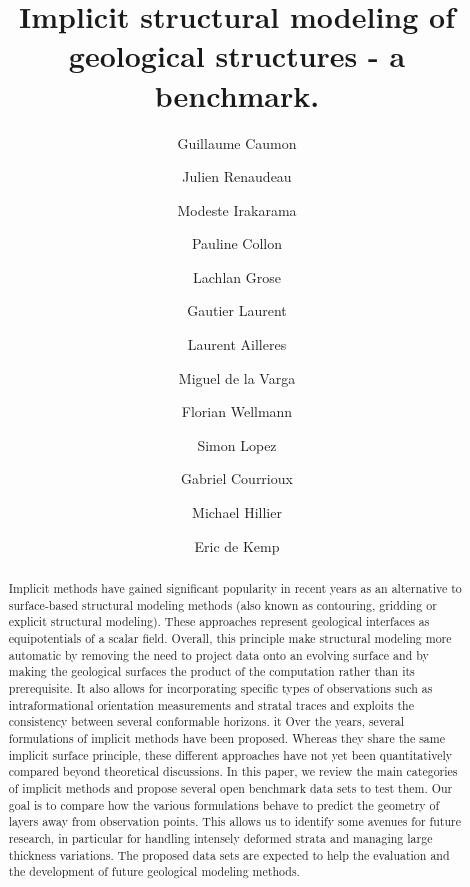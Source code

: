 \documentclass[preprint]{elsarticle}
\title{Implicit structural modeling of geological structures - a benchmark.}
\author[1]{Guillaume Caumon}
\author[1,2]{Julien Renaudeau}
\author[1]{Modeste Irakarama}
\author[1]{Pauline Collon}
\author[3]{Lachlan Grose}
\author[4]{Gautier Laurent}
\author[3]{Laurent Ailleres}
\author[5]{Miguel de la Varga}
\author[5]{Florian Wellmann}
\author[6]{Simon Lopez}
\author[6]{Gabriel Courrioux}
\author[7]{Michael Hillier}
\author[7]{Eric de Kemp}
\begin{document}
\maketitle

\begin{abstract}

Implicit methods have gained significant popularity in recent years as 
an alternative to surface-based structural modeling methods (also known as 
contouring, gridding or explicit structural modeling). These approaches represent 
geological interfaces as equipotentials of a scalar field. 
Overall, this principle make structural modeling more automatic 
by removing the need to project data onto an evolving surface and by making 
the geological surfaces the product of the computation rather than its 
prerequisite. It also allows for incorporating specific types of observations such as 
intraformational orientation measurements and stratal traces and exploits the 
consistency between several conformable horizons. it  Over the years, several 
formulations of implicit methods have been proposed. Whereas they share the 
same implicit surface principle, these different approaches have not yet been 
quantitatively compared beyond theoretical discussions. In this paper, we review 
the main categories of implicit methods and propose several open benchmark data 
sets to test them. Our goal is to compare how the various 
formulations behave to predict the geometry of layers away from observation 
points. This allows us to identify some avenues for future research, in 
particular for handling intensely deformed strata and managing large 
thickness variations. The proposed data sets are expected to help the evaluation 
and the development of future geological modeling methods. 

\end{abstract}



\end{document}
